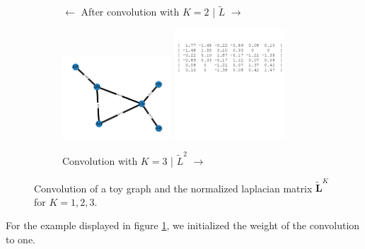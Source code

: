 \begin{figure}
\begin{subfigure}{0.45\textwidth}
        \caption{$\leftarrow$ After convolution with $K=2$ | $\tilde{L}$ $\rightarrow$}
    \end{subfigure}
    \hfill
    \begin{subfigure}{0.45\textwidth}
        \centering
        \includegraphics[width=0.45\textwidth]{figures/toy_graph_conv_K3.png}
        \includegraphics[width=0.45\textwidth]{figures/lap2.png}
        \caption{Convolution with $K=3$ | $\tilde{L}^2$ $\rightarrow$ }
    \end{subfigure}
    \caption{Convolution of a toy graph and the normalized laplacian matrix $\widetilde{\mathbf{L}}^K$ for $K=1, 2, 3$.}
    \label{fig:toyGraph}
 \end{figure}
For the example displayed in figure \ref{fig:toyGraph}, we initialized the weight of the convolution to one.

